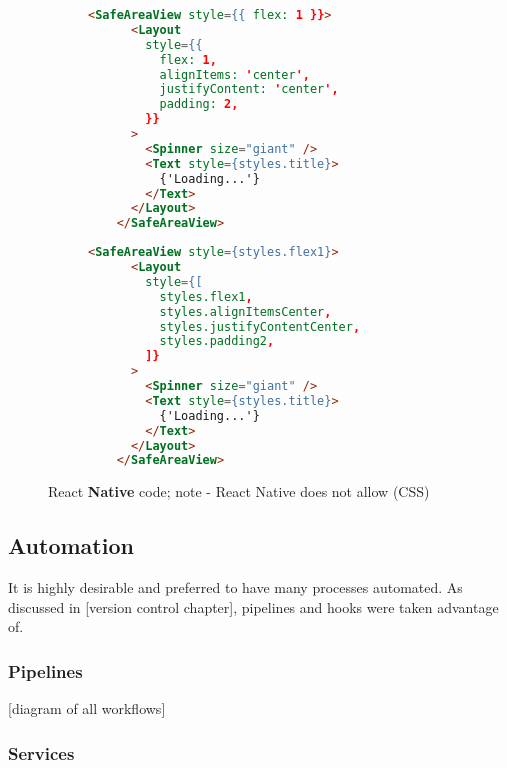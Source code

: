 \documentclass{l4proj}
\begin{document}
\begin{figure}
    \centering
    \noindent\begin{subfigure}{.49\textwidth}
    \begin{lstlisting}[language=html, caption={normal usage, with increased complexity [rnstyle]}]
    <SafeAreaView style={{ flex: 1 }}>
      <Layout
        style={{
          flex: 1,
          alignItems: 'center',
          justifyContent: 'center',
          padding: 2,
        }}
      >
        <Spinner size="giant" />
        <Text style={styles.title}>
          {'Loading...'}
        </Text>
      </Layout>
    </SafeAreaView>
    \end{lstlisting}
    \end{subfigure}\hfill
    \begin{subfigure}{.49\textwidth}

    \begin{lstlisting}[language=html, caption={example of usage like Bootstrap in \href{https://github.com/ineshbose/portion-mate/blob/82a726e58c501ab2b4fe9c5f18ac399fb29b0422/src/app/navigation/RootNavigator.tsx\#L13}{\code{src/app/navigation/RootNavigator.tsx}}}]
    <SafeAreaView style={styles.flex1}>
      <Layout
        style={[
          styles.flex1,
          styles.alignItemsCenter,
          styles.justifyContentCenter,
          styles.padding2,
        ]}
      >
        <Spinner size="giant" />
        <Text style={styles.title}>
          {'Loading...'}
        </Text>
      </Layout>
    </SafeAreaView>
    \end{lstlisting}
    \end{subfigure}
    \caption{React \textbf{Native} code; note - React Native does not allow  (CSS)}
\end{figure}

\subsection{Automation}

It is highly desirable and preferred to have many processes automated. As discussed in [version control chapter], pipelines and hooks were taken advantage of.

\subsubsection{Pipelines}

[diagram of all workflows]

\subsubsection{Services}
\end{document}
